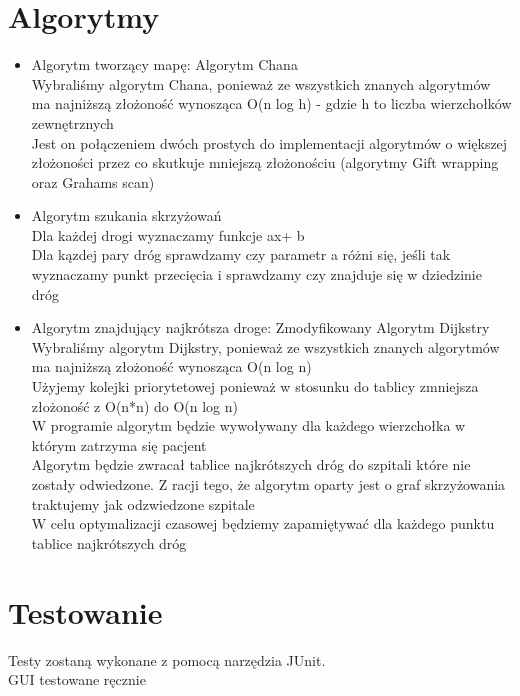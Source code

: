 \documentclass[] {article}
\begin{document}
\section{Algorytmy}
\begin{itemize}
\item Algorytm tworzący mapę: Algorytm Chana\\
Wybraliśmy algorytm Chana, ponieważ ze wszystkich znanych algorytmów ma najniższą złożoność wynosząca O(n log h) - gdzie h to liczba wierzchołków zewnętrznych\\
Jest on połączeniem dwóch prostych do implementacji algorytmów o większej złożoności przez co skutkuje mniejszą złożonościu (algorytmy Gift wrapping oraz Grahams scan)\\


\item Algorytm szukania skrzyżowań\\
Dla każdej drogi wyznaczamy funkcje ax+ b\\
Dla kązdej pary dróg sprawdzamy czy parametr a różni się, jeśli tak wyznaczamy punkt przecięcia i sprawdzamy czy znajduje się w dziedzinie dróg\\




\item Algorytm znajdujący najkrótsza droge:  Zmodyfikowany Algorytm Dijkstry\\
Wybraliśmy algorytm Dijkstry, ponieważ ze wszystkich znanych algorytmów ma najniższą złożoność wynosząca O(n log n)\\
Użyjemy kolejki priorytetowej ponieważ w stosunku do tablicy zmniejsza złożoność z O(n*n) do O(n log n)\\
W programie algorytm będzie wywoływany dla każdego wierzchołka w którym zatrzyma się pacjent\\
Algorytm będzie zwracał tablice najkrótszych dróg do szpitali które nie zostały odwiedzone. Z racji tego, że algorytm oparty jest o graf skrzyżowania traktujemy jak odzwiedzone szpitale\\
W celu optymalizacji czasowej będziemy zapamiętywać dla każdego punktu tablice najkrótszych dróg\\
\end{itemize}


\section{Testowanie}
Testy zostaną wykonane z pomocą narzędzia JUnit.\\
GUI testowane ręcznie
\end{document}
